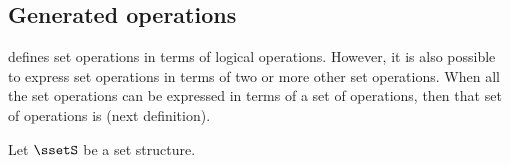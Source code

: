 \subsection{Generated operations}
defines set operations in terms of logical operations.
However, it is also possible to express set operations in terms of two or more other set operations.
When all the set operations can be expressed in terms of a set of operations,
then that set of operations is  
(next definition).
\begin{definition}
\label{def:fcomplete}
Let $\ssetS$ be a set structure.
\end{definition}

